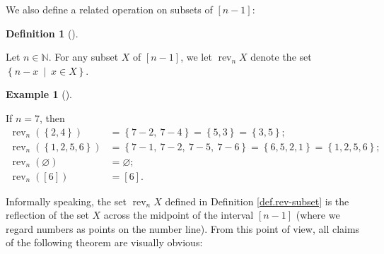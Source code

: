 \documentclass[numbers=enddot,12pt,final,onecolumn,notitlepage]{scrartcl}%
\theoremstyle{definition}
\newtheorem{defi}[theo]{Definition}
\newenvironment{definition}[1][]
{\begin{defi}[#1]\begin{leftbar}}
{\end{leftbar}\end{defi}}
\newtheorem{exam}[theo]{Example}
\newenvironment{example}[1][]
{\begin{exam}[#1]\begin{leftbar}}
{\end{leftbar}\end{exam}}
\begin{document}
We also define a related operation on subsets of $\left[  n-1\right]  $:

\begin{definition}
\label{def.rev-subset}Let $n\in\mathbb{N}$. For any subset $X$ of $\left[
n-1\right]  $, we let $\operatorname*{rev}\nolimits_{n}X$ denote the set
$\left\{  n-x\ \mid\ x\in X\right\}  $.
\end{definition}

\begin{example}
If $n=7$, then%
\begin{align*}
\operatorname*{rev}\nolimits_{n}\left(  \left\{  2,4\right\}  \right)   &
=\left\{  7-2,\ 7-4\right\}  =\left\{  5,3\right\}  =\left\{  3,5\right\}  ;\\
\operatorname*{rev}\nolimits_{n}\left(  \left\{  1,2,5,6\right\}  \right)   &
=\left\{  7-1,\ 7-2,\ 7-5,\ 7-6\right\}  =\left\{  6,5,2,1\right\}  =\left\{
1,2,5,6\right\}  ;\\
\operatorname*{rev}\nolimits_{n}\left(  \varnothing\right)   &  =\varnothing
;\\
\operatorname*{rev}\nolimits_{n}\left(  \left[  6\right]  \right)   &
=\left[  6\right]  .
\end{align*}

\end{example}

Informally speaking, the set $\operatorname*{rev}\nolimits_{n}X$ defined in
Definition \ref{def.rev-subset} is the reflection of the set $X$ across the
midpoint of the interval $\left[  n-1\right]  $ (where we regard numbers as
points on the number line). From this point of view, all claims of the
following theorem are visually obvious:
\end{document}
